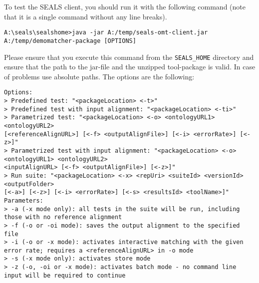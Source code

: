 \documentclass{article}
\begin{document}
To test the SEALS client, you should run it with the following command (note that it is a single command without any line breaks).
\begin{verbatim}
A:\seals\sealshome>java -jar A:/temp/seals-omt-client.jar
A:/temp/demomatcher-package [OPTIONS]
\end{verbatim}
Please ensure that you execute this command from the \verb|SEALS_HOME| directory and ensure that the path to the jar-file and the unzipped tool-package is valid. In case of problems use absolute paths. The options are the following:
\small
\begin{verbatim}
Options:
> Predefined test: "<packageLocation> <-t>"
> Predefined test with input alignment: "<packageLocation> <-ti>"
> Parametrized test: "<packageLocation> <-o> <ontologyURL1> <ontologyURL2>
[<referenceAlignURL>] [<-f> <outputAlignFile>] [<-i> <errorRate>] [<-z>]"
> Parametrized test with input alignment: "<packageLocation> <-o> <ontologyURL1> <ontologyURL2>
<inputAlignURL> [<-f> <outputAlignFile>] [<-z>]"
> Run suite: "<packageLocation> <-x> <repUri> <suiteId> <versionId> <outputFolder>
[<-a>] [<-z>] [<-i> <errorRate>] [<-s> <resultsId> <toolName>]"
Parameters:
> -a (-x mode only): all tests in the suite will be run, including those with no reference alignment
> -f (-o or -oi mode): saves the output alignment to the specified file
> -i (-o or -x mode): activates interactive matching with the given error rate; requires a <referenceAlignURL> in -o mode
> -s (-x mode only): activates store mode
> -z (-o, -oi or -x mode): activates batch mode - no command line input will be required to continue
\end{verbatim}
\normalsize
\end{document}

